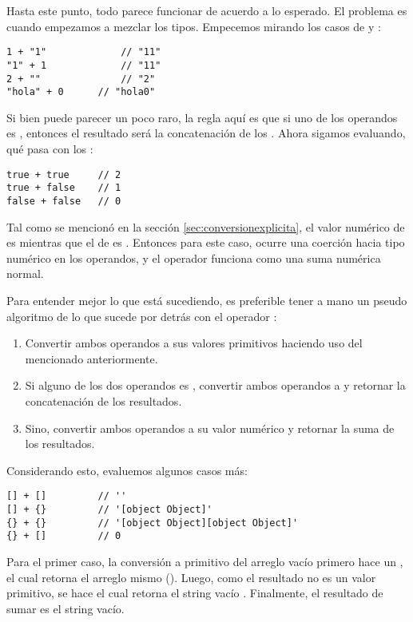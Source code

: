 Hasta este punto, todo parece funcionar de acuerdo a lo esperado. El problema es cuando empezamos a mezclar los tipos. Empecemos mirando los casos de  y :

\begin{lstlisting}[title={Operador \code{+} mezclando strings con números}]
1 + "1"				// "11"
"1" + 1				// "11"
2 + ""				// "2"
"hola" + 0		// "hola0"
\end{lstlisting}

Si bien puede parecer un poco raro, la regla aquí es que si uno de los operandos es , entonces el resultado será la concatenación de los . Ahora sigamos evaluando, qué pasa con los :

\begin{lstlisting}[title={Operador \code{+} en booleanos}]
true + true		// 2
true + false	// 1
false + false	// 0
\end{lstlisting}

Tal como se mencionó en la sección \ref{sec:conversionexplicita}, el valor numérico de  es  mientras que el de  es . Entonces para este caso, ocurre una coerción hacia tipo numérico en los operandos, y el operador \code{+} funciona como una suma numérica normal.

Para entender mejor lo que está sucediendo, es preferible tener a mano un pseudo algoritmo de lo que sucede por detrás con el operador \code{+}:

\begin{enumerate}
\item Convertir ambos operandos a sus valores primitivos haciendo uso del  mencionado anteriormente.
\item Si alguno de los dos operandos es , convertir ambos operandos a  y retornar la concatenación de los resultados.
\item Sino, convertir ambos operandos a su valor numérico y retornar la suma de los resultados.
\end{enumerate}

Considerando esto, evaluemos algunos casos más:

\begin{lstlisting}[title={Operador \code{+} con arreglos y objetos}]
[] + []			// ''
[] + {}			// '[object Object]'
{} + {}			// '[object Object][object Object]'
{} + []			// 0
\end{lstlisting}

Para el primer caso, la conversión a primitivo del arreglo vacío \code{[]} primero hace un , el cual retorna el arreglo mismo (). Luego, como el resultado no es un valor primitivo, se hace  el cual retorna el string vacío . Finalmente, el resultado de sumar \code{[] + []} es el string vacío.

